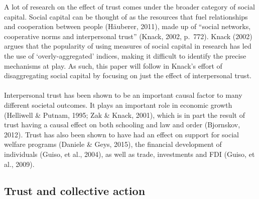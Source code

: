 \documentclass[
  11pt,
]{article}
\begin{document}
A lot of research on the effect of trust comes under the broader category of social capital. Social capital can be thought of as the resources that fuel relationships and cooperation between people (Häuberer, 2011), made up of ``social networks, cooperative norms and interpersonal trust'' (Knack, 2002, p.~772). Knack (2002) argues that the popularity of using measures of social capital in research has led the use of `overly-aggregated' indices, making it difficult to identify the precise mechanisms at play. As such, this paper will follow in Knack's effort of disaggregating social capital by focusing on just the effect of interpersonal trust.\\
~\\
Interpersonal trust has been shown to be an important causal factor to many different societal outcomes. It plays an important role in economic growth (Helliwell \& Putnam, 1995; Zak \& Knack, 2001), which is in part the result of trust having a causal effect on both schooling and law and order (Bjornskov, 2012). Trust has also been shown to have had an effect on support for social welfare programs (Daniele \& Geys, 2015), the financial development of individuals (Guiso, et al., 2004), as well as trade, investments and FDI (Guiso, et al., 2009).\\

\hypertarget{trust-and-collective-action}{%
\subsection{Trust and collective action}\label{trust-and-collective-action}}
\end{document}
